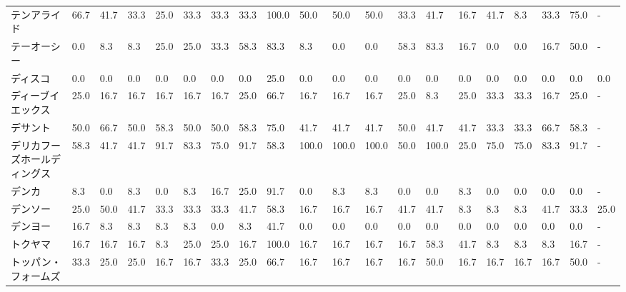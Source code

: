 \documentclass[a4paper，11pt]{jsarticle}
\begin{document}
\begin{longtable}[c]{lp{3mm}p{3mm}p{3mm}p{3mm}p{3mm}p{3mm}p{3mm}p{3mm}p{3mm}p{3mm}p{3mm}p{3mm}p{3mm}p{3mm}p{3mm}p{3mm}p{3mm}p{3mm}p{3mm}}
テンアライド          &   66.7 &   41.7 &      33.3 &      25.0 &       33.3 &   33.3 &   33.3 &  100.0 &    50.0 &    50.0 &   50.0 &  33.3 &   41.7 &    16.7 &    41.7 &   8.3 &  33.3 &  75.0 &     - \\
テーオーシー          &    0.0 &    8.3 &       8.3 &      25.0 &       25.0 &   33.3 &   58.3 &   83.3 &     8.3 &     0.0 &    0.0 &  58.3 &   83.3 &    16.7 &     0.0 &   0.0 &  16.7 &  50.0 &     - \\
ディスコ            &    0.0 &    0.0 &       0.0 &       0.0 &        0.0 &    0.0 &    0.0 &   25.0 &     0.0 &     0.0 &    0.0 &   0.0 &    0.0 &     0.0 &     0.0 &   0.0 &   0.0 &   0.0 &   0.0 \\
ディーブイエックス       &   25.0 &   16.7 &      16.7 &      16.7 &       16.7 &   16.7 &   25.0 &   66.7 &    16.7 &    16.7 &   16.7 &  25.0 &    8.3 &    25.0 &    33.3 &  33.3 &  16.7 &  25.0 &     - \\
デサント            &   50.0 &   66.7 &      50.0 &      58.3 &       50.0 &   50.0 &   58.3 &   75.0 &    41.7 &    41.7 &   41.7 &  50.0 &   41.7 &    41.7 &    33.3 &  33.3 &  66.7 &  58.3 &     - \\
デリカフーズホールディングス  &   58.3 &   41.7 &      41.7 &      91.7 &       83.3 &   75.0 &   91.7 &   58.3 &   100.0 &   100.0 &  100.0 &  50.0 &  100.0 &    25.0 &    75.0 &  75.0 &  83.3 &  91.7 &     - \\
デンカ             &    8.3 &    0.0 &       8.3 &       0.0 &        8.3 &   16.7 &   25.0 &   91.7 &     0.0 &     8.3 &    8.3 &   0.0 &    0.0 &     8.3 &     0.0 &   0.0 &   0.0 &   0.0 &     - \\
デンソー            &   25.0 &   50.0 &      41.7 &      33.3 &       33.3 &   33.3 &   41.7 &   58.3 &    16.7 &    16.7 &   16.7 &  41.7 &   41.7 &     8.3 &     8.3 &   8.3 &  41.7 &  33.3 &  25.0 \\
デンヨー            &   16.7 &    8.3 &       8.3 &       8.3 &        8.3 &    0.0 &    8.3 &   41.7 &     0.0 &     0.0 &    0.0 &   0.0 &    0.0 &     0.0 &     0.0 &   0.0 &   0.0 &   0.0 &     - \\
トクヤマ            &   16.7 &   16.7 &      16.7 &       8.3 &       25.0 &   25.0 &   16.7 &  100.0 &    16.7 &    16.7 &   16.7 &  16.7 &   58.3 &    41.7 &     8.3 &   8.3 &   8.3 &  16.7 &     - \\
トッパン・フォームズ      &   33.3 &   25.0 &      25.0 &      16.7 &       16.7 &   33.3 &   25.0 &   66.7 &    16.7 &    16.7 &   16.7 &  16.7 &   50.0 &    16.7 &    16.7 &  16.7 &  16.7 &  50.0 &     - \\

\end{longtable}
\end{document}
